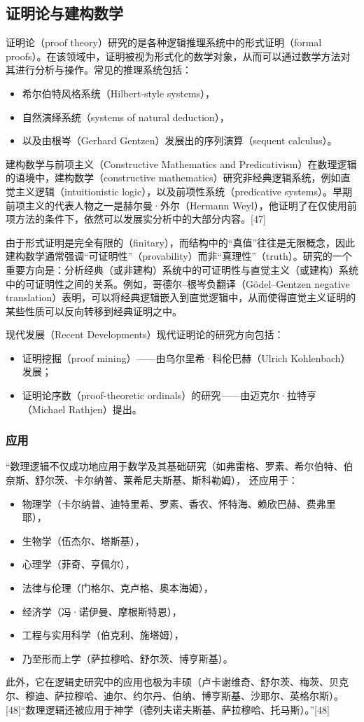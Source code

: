 \subsection{证明论与建构数学}
证明论（proof theory）研究的是各种逻辑推理系统中的形式证明（formal proofs）。在该领域中，证明被视为形式化的数学对象，从而可以通过数学方法对其进行分析与操作。常见的推理系统包括：
\begin{itemize}
  \item 希尔伯特风格系统（Hilbert-style systems），
  \item 自然演绎系统（systems of natural deduction），
  \item 以及由根岑（Gerhard Gentzen）发展出的序列演算（sequent calculus）。
\end{itemize}
建构数学与前项主义（Constructive Mathematics and Predicativism）在数理逻辑的语境中，建构数学（constructive mathematics）研究非经典逻辑系统，例如直觉主义逻辑（intuitionistic logic），以及前项性系统（predicative systems）。早期前项主义的代表人物之一是赫尔曼·外尔（Hermann Weyl），他证明了在仅使用前项方法的条件下，依然可以发展实分析中的大部分内容。[47]

由于形式证明是完全有限的（finitary），而结构中的“真值”往往是无限概念，因此建构数学通常强调“可证明性”（provability）而非“真理性”（truth）。研究的一个重要方向是：分析经典（或非建构）系统中的可证明性与直觉主义（或建构）系统中的可证明性之间的关系。例如，哥德尔–根岑负翻译（Gödel–Gentzen negative translation）表明，可以将经典逻辑嵌入到直觉逻辑中，从而使得直觉主义证明的某些性质可以反向转移到经典证明之中。

现代发展（Recent Developments）现代证明论的研究方向包括：
\begin{itemize}
  \item 证明挖掘（proof mining）——由乌尔里希·科伦巴赫（Ulrich Kohlenbach）发展；
  \item 证明论序数（proof-theoretic ordinals）的研究——由迈克尔·拉特亨（Michael Rathjen）提出。
\end{itemize}
\subsubsection{应用}
“数理逻辑不仅成功地应用于数学及其基础研究（如弗雷格、罗素、希尔伯特、伯奈斯、舒尔茨、卡尔纳普、莱希尼夫斯基、斯科勒姆），  
还应用于：
\begin{itemize}
  \item 物理学（卡尔纳普、迪特里希、罗素、香农、怀特海、赖欣巴赫、费弗里耶），
  \item 生物学（伍杰尔、塔斯基），
  \item 心理学（菲奇、亨佩尔），
  \item 法律与伦理（门格尔、克卢格、奥本海姆），
  \item 经济学（冯·诺伊曼、摩根斯特恩），
  \item 工程与实用科学（伯克利、施塔姆），
  \item 乃至形而上学（萨拉穆哈、舒尔茨、博亨斯基）。
\end{itemize}
此外，它在逻辑史研究中的应用也极为丰硕（卢卡谢维奇、舒尔茨、梅茨、贝克尔、穆迪、萨拉穆哈、迪尔、约尔丹、伯纳、博亨斯基、沙耶尔、英格尔斯）。[48]“数理逻辑还被应用于神学（德列夫诺夫斯基、萨拉穆哈、托马斯）。”[48]

